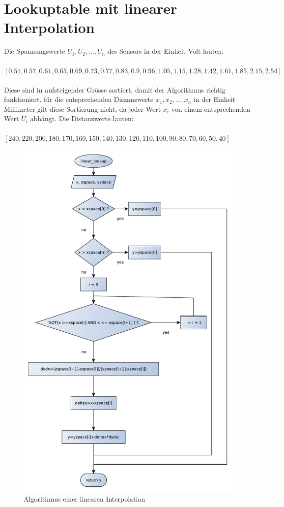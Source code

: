 \documentclass[a4paper]{report}
\begin{document}
\section{Lookuptable mit linearer Interpolation}
Die Spannungswerte $U_1, U_2, ..., U_n$  des Sensors in der Einheit Volt lauten:\\ \\
\([0.51, 0.57, 0.61, 0.65, 0.69, 0.73, 0.77, 0.83, 0.9, 0.96, 1.05, 1.15, 1.28, 1.42, 1.61, 1.85, 2.15, 2.54]\)\\ \\
Diese sind in aufsteigender Gr\"osse sortiert, damit der Algorithmus richtig funktioniert. f\"ur die entsprechenden Diszanzwerte $x_1, x_2, ..., x_n$  in der Einheit Millimeter gilt diese Sortierung nicht, da jeder Wert $x_i$ von einem entsprechenden Wert $U_i$ abh\"angt. Die Distanzwerte lauten:\\ \\
\([240, 220, 200, 180, 170, 160, 150, 140,130, 120, 110, 100, 90, 80, 70, 60, 50, 40] \)
\begin{figure}[H]
\centering
\includegraphics{img/lookup_diagram.pdf}
\caption{Algorithmus einer linearen Interpolation}
\end{figure}
\end{document}
